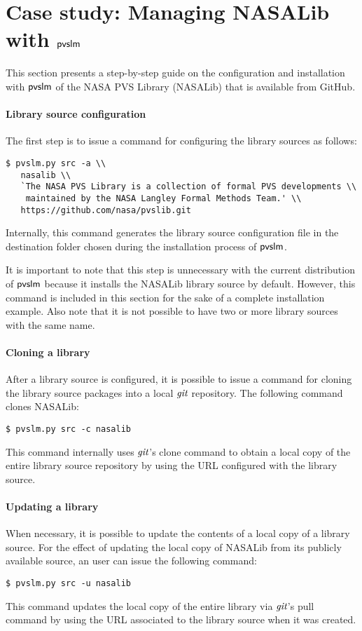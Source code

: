 \section{Case study: Managing NASALib with $\textsf{pvslm}$}
\label{sec.nasalib}

This section presents a step-by-step guide on the configuration and
installation with $\textsf{pvslm}$ of the NASA PVS Library (NASALib) that is
available from GitHub.

\paragraph{Library source configuration}
The first step is to issue a command for configuring the library sources
as follows:
%
{\small
\begin{lstlisting}
$ pvslm.py src -a \\
   nasalib \\
   `The NASA PVS Library is a collection of formal PVS developments \\
    maintained by the NASA Langley Formal Methods Team.' \\
   https://github.com/nasa/pvslib.git
\end{lstlisting}
}
%
Internally, this command generates the library source
configuration file in the destination folder chosen during the
installation process of $\textsf{pvslm}$.

It is important to note that this step is unnecessary with the current
distribution of $\textsf{pvslm}$ because it installs the NASALib library
source by default.  However, this command is included in this section
for the sake of a complete installation example. Also note that it is
not possible to have two or more library sources with the same name.

\paragraph{Cloning a library} After a library source
is configured, it is possible to issue a command for cloning the
library source packages into a local $\textit{git}$ repository. The following
command clones NASALib:
%
\begin{verbatim}
$ pvslm.py src -c nasalib
\end{verbatim}
%
This command internally uses $\textit{git}$'s clone command to obtain a local
copy of the entire library source repository by using the URL
configured with the library source.

\paragraph{Updating a library} When necessary, it is possible to update
the contents of a local copy of a library source. For the effect of
updating the local copy of NASALib from its publicly available source,
an user can issue the following command:
%
\begin{verbatim}
$ pvslm.py src -u nasalib
\end{verbatim}
%
This command updates the local copy of the entire library via $\textit{git}$'s
pull command by using the URL associated to the library source when it
was created.

